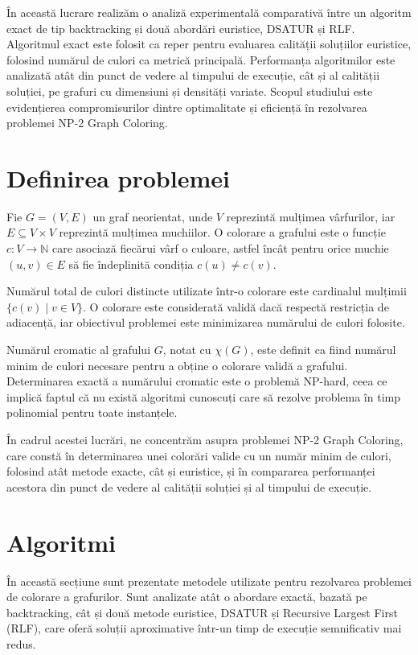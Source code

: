 \documentclass[runningheads]{llncs}
\begin{document}
În această lucrare realizăm o analiză experimentală comparativă între un
algoritm exact de tip backtracking și două abordări euristice, DSATUR și RLF.
Algoritmul exact este folosit ca reper pentru evaluarea calității soluțiilor
euristice, folosind numărul de culori ca metrică principală. Performanța
algoritmilor este analizată atât din punct de vedere al timpului de execuție,
cât și al calității soluției, pe grafuri cu dimensiuni și densități variate.
Scopul studiului este evidențierea compromisurilor dintre optimalitate și
eficiență în rezolvarea problemei NP-2 Graph Coloring.

\section{Definirea problemei}

Fie $G = (V, E)$ un graf neorientat, unde $V$ reprezintă mulțimea vârfurilor,
iar $E \subseteq V \times V$ reprezintă mulțimea muchiilor. O colorare a
grafului este o funcție $c : V \rightarrow \mathbb{N}$ care asociază fiecărui
vârf o culoare, astfel încât pentru orice muchie $(u, v) \in E$ să fie
îndeplinită condiția $c(u) \neq c(v)$.

Numărul total de culori distincte utilizate într-o colorare este cardinalul
mulțimii $\{c(v) \mid v \in V\}$. O colorare este considerată validă dacă
respectă restricția de adiacență, iar obiectivul problemei este minimizarea
numărului de culori folosite.

Numărul cromatic al grafului $G$, notat cu $\chi(G)$, este definit ca fiind
numărul minim de culori necesare pentru a obține o colorare validă a grafului.
Determinarea exactă a numărului cromatic este o problemă NP-hard, ceea ce
implică faptul că nu există algoritmi cunoscuți care să rezolve problema în
timp polinomial pentru toate instanțele.

În cadrul acestei lucrări, ne concentrăm asupra problemei NP-2 Graph Coloring,
care constă în determinarea unei colorări valide cu un număr minim de culori,
folosind atât metode exacte, cât și euristice, și în compararea performanței
acestora din punct de vedere al calității soluției și al timpului de execuție.

\section{Algoritmi}

În această secțiune sunt prezentate metodele utilizate pentru rezolvarea
problemei de colorare a grafurilor. Sunt analizate atât o abordare exactă,
bazată pe backtracking, cât și două metode euristice, DSATUR și Recursive
Largest First (RLF), care oferă soluții aproximative într-un timp de execuție
semnificativ mai redus.
\end{document}
